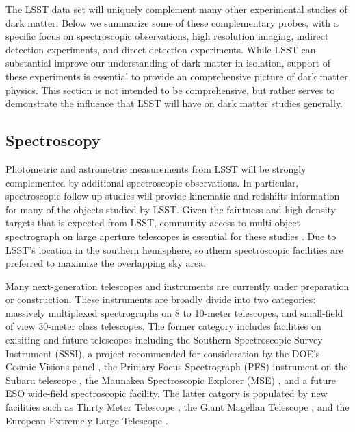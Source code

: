 
The LSST data set will uniquely complement many other experimental studies of dark matter.
Below we summarize some of these complementary probes, with a specific focus on spectroscopic observations, high resolution imaging, indirect detection experiments, and direct detection experiments.
While LSST can substantial improve our understanding of dark matter in isolation, support of these experiments is essential to provide an comprehensive picture of dark matter physics.
This section is not intended to be comprehensive, but rather serves to demonstrate the influence that LSST will have on dark matter studies generally.

\subsection{Spectroscopy }
\label{sec:spectroscopy}


Photometric and astrometric measurements from LSST will be strongly complemented by additional spectroscopic observations. 
In particular, spectroscopic follow-up studies will provide kinematic and redshifts information for many of the objects studied by LSST.
Given the faintness and high density targets that is expected from LSST, community access to multi-object spectrograph on large aperture telescopes is essential for these studies \citep{1610.01661}. 
Due to LSST's location in the southern hemisphere, southern spectroscopic facilities are preferred to maximize the overlapping sky area.

Many next-generation telescopes and instruments are currently under preparation or construction. These instruments are broadly divide into two categories: massively multiplexed spectrographs on 8 to 10-meter telescopes, and small-field of view 30-meter class telescopes. The former category includes facilities on exisiting and future telescopes including the Southern Spectroscopic Survey Instrument (SSSI), a project recommended for consideration by the DOE’s Cosmic Visions panel \citep{1604.07626, 1604.07821}, the Primary Focus Spectrograph (PFS) instrument on the Subaru telescope \citep{2014PASJ...66R...1T}, the Maunakea Spectroscopic Explorer (MSE) \citep{1810.08695}, and a future ESO wide-field spectroscopic facility. 
The latter catgory is populated by new facilities such as Thirty Meter Telescope \citep[TMT;][]{1505.01195}, the Giant Magellan Telescope \citep[GMT;][]{GMT:2018}, and the European Extremely Large Telescope \citep[E-ELT;][]{EELT:2010}. 


